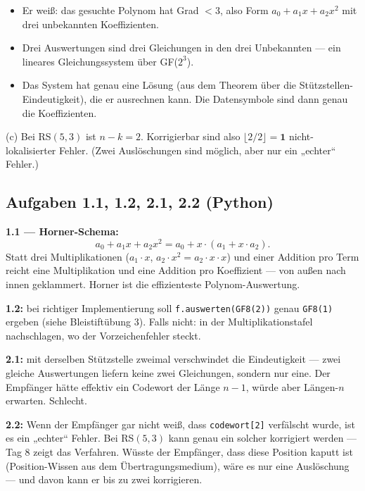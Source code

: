 \begin{itemize}
\item Er weiß: das gesuchte Polynom hat Grad $< 3$, also Form
  $a_0 + a_1 x + a_2 x^2$ mit drei unbekannten Koeffizienten.
\item Drei Auswertungen sind drei Gleichungen in den drei
  Unbekannten — ein lineares Gleichungssystem über GF($2^3$).
\item Das System hat genau eine Lösung (aus dem Theorem über die
  Stützstellen-Eindeutigkeit), die er ausrechnen kann. Die
  Datensymbole sind dann genau die Koeffizienten.
\end{itemize}

(c) Bei RS$(5, 3)$ ist $n - k = 2$. Korrigierbar sind also
$\lfloor 2/2 \rfloor = \mathbf{1}$ nicht-lokalisierter Fehler. (Zwei
Auslöschungen sind möglich, aber nur ein „echter“ Fehler.)

\subsection*{Aufgaben 1.1, 1.2, 2.1, 2.2 (Python)}

\textbf{1.1 — Horner-Schema:}
\[
  a_0 + a_1 x + a_2 x^2 = a_0 + x \cdot (a_1 + x \cdot a_2).
\]
Statt drei Multiplikationen ($a_1 \cdot x$, $a_2 \cdot x^2 = a_2 \cdot
x \cdot x$) und einer Addition pro Term reicht eine Multiplikation
und eine Addition pro Koeffizient — von außen nach innen geklammert.
Horner ist die effizienteste Polynom-Auswertung.

\textbf{1.2:} bei richtiger Implementierung soll
\texttt{f.auswerten(GF8(2))} genau \texttt{GF8(1)} ergeben (siehe
Bleistiftübung 3). Falls nicht: in der Multiplikationstafel
nachschlagen, wo der Vorzeichenfehler steckt.

\textbf{2.1:} mit derselben Stützstelle zweimal verschwindet die
Eindeutigkeit — zwei gleiche Auswertungen liefern keine zwei
Gleichungen, sondern nur eine. Der Empfänger hätte effektiv ein
Codewort der Länge $n-1$, würde aber Längen-$n$ erwarten. Schlecht.

\textbf{2.2:} Wenn der Empfänger gar nicht weiß, dass
\texttt{codewort[2]} verfälscht wurde, ist es ein „echter“ Fehler.
Bei RS$(5, 3)$ kann genau ein solcher korrigiert werden — Tag 8 zeigt
das Verfahren. Wüsste der Empfänger, dass diese Position kaputt ist
(Position-Wissen aus dem Übertragungsmedium), wäre es nur eine
Auslöschung — und davon kann er bis zu zwei korrigieren.
